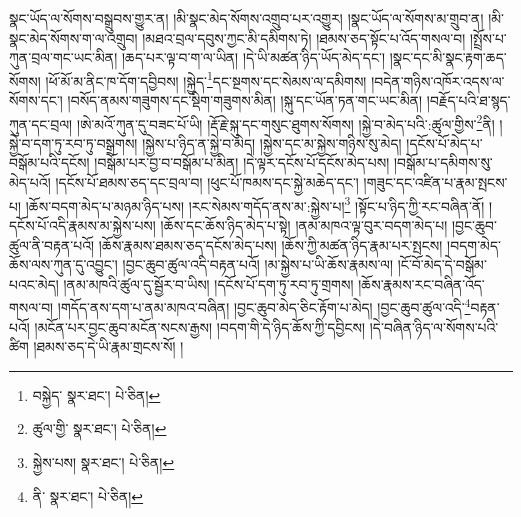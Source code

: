 སྣང་ཡོད་ལ་སོགས་བསྒྲུབས་གྱུར་ན། །མི་སྣང་མེད་སོགས་འགྲུབ་པར་འགྱུར། །སྣང་ཡོད་ལ་སོགས་མ་གྲུབ་ན། །མི་སྣང་མེད་སོགས་ག་ལ་འགྲུབ། །མཐའ་བྲལ་དབུས་ཀྱང་མི་དམིགས་ཏེ། །ཐམས་ཅད་སྟོང་པ་འོད་གསལ་བ། །སྤྲོས་པ་ཀུན་བྲལ་གང་ཡང་མིན། །ཆད་པར་ལྟ་བ་ག་ལ་ཡིན། །དེ་ཡི་མཚན་ཉིད་ཡོད་མེད་དང་། །སྣང་དང་མི་སྣང་རྟག་ཆད་སོགས། །ཕོ་མོ་མ་ནིང་ཁ་དོག་དབྱིབས། །སྐྱེད་\footnote{བསྐྱེད་  སྣར་ཐང་།  པེ་ཅིན། }དང་སྔགས་དང་སེམས་ལ་དམིགས། །བདེན་གཉིས་འཁོར་འདས་ལ་སོགས་དང་། །བསོད་ནམས་གཟུགས་དང་སྡིག་གཟུགས་མིན། །སྐུ་དང་ཡོན་ཏན་གང་ཡང་མིན། །བརྗོད་པའི་ཐ་སྙད་ཀུན་དང་བྲལ། །ཨེ་མའོ་ཀུན་དུ་བཟང་པོ་ཡི། །རྡོ་རྗེ་སྐུ་དང་གསུང་ཐུགས་སོགས། །སྐྱེ་བ་མེད་པའི་:ཚུལ་གྱིས་\footnote{ཚུལ་གྱི་  སྣར་ཐང་།  པེ་ཅིན། }ནི། །སྐྱེ་བ་དག་ཏུ་རབ་ཏུ་བསྒྲགས། །སྐྱེས་པ་ཉིད་ན་སྐྱེ་བ་མེད། །སྐྱེས་དང་མ་སྐྱེས་གཉིས་སུ་མེད། །དངོས་པོ་མེད་པ་བསྒོམ་པའི་དངོས། །བསྒོམ་པར་བྱ་བ་བསྒོམ་པ་མིན། །དེ་ལྟར་དངོས་པོ་དངོས་མེད་པས། །བསྒོམ་པ་དམིགས་སུ་མེད་པའོ། །དངོས་པོ་ཐམས་ཅད་དང་བྲལ་བ། །ཕུང་པོ་ཁམས་དང་སྐྱེ་མཆེད་དང་། །གཟུང་དང་འཛིན་པ་རྣམ་སྤངས་པ། །ཆོས་བདག་མེད་པ་མཉམ་ཉིད་པས། །རང་སེམས་གདོད་ནས་མ་:སྐྱེས་པ།\footnote{སྐྱེས་པས།  སྣར་ཐང་།  པེ་ཅིན། } །སྟོང་པ་ཉིད་ཀྱི་རང་བཞིན་ནོ། །དངོས་པོ་འདི་རྣམས་མ་སྐྱེས་པས། །ཆོས་དང་ཆོས་ཉིད་མེད་པ་སྟེ། །ནམ་མཁའ་ལྟ་བུར་བདག་མེད་པ། །བྱང་ཆུབ་ཚུལ་ནི་བརྟན་པའོ། །ཆོས་རྣམས་ཐམས་ཅད་དངོས་མེད་པས། །ཆོས་ཀྱི་མཚན་ཉིད་རྣམ་པར་སྤངས། །བདག་མེད་ཆོས་ལས་ཀུན་དུ་འབྱུང་། །བྱང་ཆུབ་ཚུལ་འདི་བརྟན་པའོ། །མ་སྐྱེས་པ་ཡི་ཆོས་རྣམས་ལ། །ངོ་བོ་མེད་དེ་བསྒོམ་པའང་མེད། །ནམ་མཁའི་ཚུལ་དུ་སྦྱོར་བ་ཡིས། །དངོས་པོ་དག་ཏུ་རབ་ཏུ་གྲགས། །ཆོས་རྣམས་རང་བཞིན་འོད་གསལ་བ། །གདོད་ནས་དག་པ་ནམ་མཁའ་བཞིན། །བྱང་ཆུབ་མེད་ཅིང་རྟོག་པ་མེད། །བྱང་ཆུབ་ཚུལ་འདི་\footnote{ནི་  སྣར་ཐང་།  པེ་ཅིན། }བརྟན་པའོ། །མངོན་པར་བྱང་ཆུབ་མངོན་སངས་རྒྱས། །བདག་གི་དེ་ཉིད་ཆོས་ཀྱི་དབྱིངས། །དེ་བཞིན་ཉིད་ལ་སོགས་པའི་ཚིག །ཐམས་ཅད་དེ་ཡི་རྣམ་གྲངས་སོ། །
